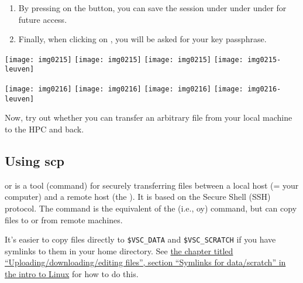   \begin{enumerate}
  \item  By pressing on the  button, you can save the session
\ifantwerpen
       under 
\fi
\ifgent
       under 
\fi
\ifbrussel
       under 
\fi
for future access.
  \item  Finally, when clicking on , you will be asked for your key passphrase.
  \end{enumerate}

  \begin{center}
\ifantwerpen
  \texttt{[image: img0215]}
\fi
\ifbrussel
  \texttt{[image: img0215]}
\fi
\ifgent
  \texttt{[image: img0215]}
\fi
\ifleuven
  \texttt{[image: img0215-leuven]}
\fi
  \end{center}
  \firsttimeconnection

  \begin{center}
\ifantwerpen
  \texttt{[image: img0216]}
\fi
\ifbrussel
  \texttt{[image: img0216]}
\fi
\ifgent
  \texttt{[image: img0216]}
\fi
\ifleuven
  \texttt{[image: img0216-leuven]}
\fi
  \end{center}

  Now, try out whether you can transfer an arbitrary file from your local
  machine to the HPC and back.

\fi

\ifmacORlinux
  \subsection{Using scp}

   or  is a tool (command) for securely
  transferring files between a local host (= your computer) and a remote host
  (the \hpc). It is based on the Secure Shell (SSH) protocol.  The 
  command is the equivalent of the   (i.e., oy)
  command, but can copy files to or from remote machines.

  It's easier to copy files directly to \lstinline|$VSC_DATA| and \lstinline|$VSC_SCRATCH|
  if you have symlinks to them in your home directory. See
  \href{\LinuxManualURL#sec:symlink-for-data}{the chapter titled ``Uploading/downloading/editing files'', section ``Symlinks for data/scratch'' in the intro to Linux}
  for how to do this.


